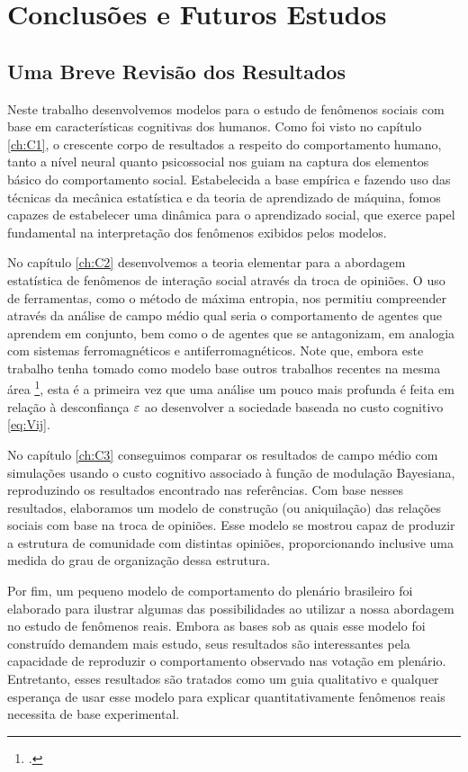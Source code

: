 
\chapter{Conclusões e Futuros Estudos}
\label{ch:C4}

\section{Uma Breve Revisão dos Resultados}

Neste trabalho desenvolvemos modelos para o estudo de fenômenos sociais com base em características cognitivas dos humanos.
Como foi visto no capítulo \ref{ch:C1}, o crescente corpo de resultados a respeito do comportamento humano, tanto a nível neural quanto psicossocial nos guiam na captura dos elementos básico do comportamento social.
Estabelecida a base empírica e fazendo uso das técnicas da mecânica estatística e da teoria de aprendizado de máquina, fomos capazes de estabelecer uma dinâmica para o aprendizado social, que exerce papel fundamental na interpretação dos fenômenos exibidos pelos modelos.

No capítulo \ref{ch:C2} desenvolvemos a teoria elementar para a abordagem estatística de fenômenos de interação social através da troca de opiniões.
O uso de ferramentas, como o método de máxima entropia, nos permitiu compreender através da análise de campo médio qual seria o comportamento de agentes que aprendem em conjunto, bem como o de agentes que se antagonizam, em analogia com sistemas ferromagnéticos e antiferromagnéticos.
Note que, embora este trabalho tenha tomado como modelo base outros trabalhos recentes na mesma área \footcite{Cesar2014,Vicente2014,Caticha2011}, esta é a primeira vez que uma análise um pouco mais profunda é feita em relação à desconfiança $\varepsilon$ ao desenvolver a sociedade baseada no custo cognitivo \eqref{eq:Vij}.

No capítulo \ref{ch:C3} conseguimos comparar os resultados de campo médio com simulações usando o custo cognitivo associado à função de modulação Bayesiana, reproduzindo os resultados encontrado nas referências.
Com base nesses resultados, elaboramos um modelo de construção (ou aniquilação) das relações sociais com base na troca de opiniões.
Esse modelo se mostrou capaz de produzir a estrutura de comunidade com distintas opiniões, proporcionando inclusive uma medida do grau de organização dessa estrutura.

Por fim, um pequeno modelo de comportamento do plenário brasileiro foi elaborado para ilustrar algumas das possibilidades ao utilizar a nossa abordagem no estudo de fenômenos reais.
Embora as bases sob as quais esse modelo foi construído demandem mais estudo, seus resultados são interessantes pela capacidade de reproduzir o comportamento observado nas votação em plenário.
Entretanto, esses resultados são tratados como um guia qualitativo e qualquer esperança de usar esse modelo para explicar quantitativamente fenômenos reais necessita de base experimental.

